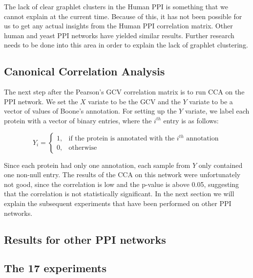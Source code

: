 The lack of clear graphlet clusters in the Human PPI is something that we cannot 
explain at the current time. Because of this, it has not been possible for us to get any actual insights from the Human PPI correlation matrix. Other human and yeast PPI networks have yielded similar results. Further research needs to be done into this area in order to explain the lack of graphlet clustering.

\subsection{Canonical Correlation Analysis}


The next step after the Pearson's GCV correlation matrix is to run CCA on the PPI network. We set the $X$ variate to be the GCV and the $Y$ variate to be a vector of values of Boone's annotation. For setting up the $Y$ variate, we label each protein with a vector of binary entries, where the $i^{th}$ entry is as follows:

$$ Y_i = \begin{cases} 1, & \mbox{if the protein is annotated with the } i^{th}\mbox{ annotation} \\ 0, & \mbox{otherwise} \end{cases}$$

Since each protein had only one annotation, each sample from $Y$ only contained one non-null entry. The results of the CCA on this network were unfortunately not good, since the correlation is low and the p-value is above 0.05, suggesting that the correlation is not statistically significant. In the next section we will explain the subsequent experiments that have been performed on other PPI networks.

\subsection{Results for other PPI networks}
\label{sec:cca_ppi_intro}

\subsection*{The 17 experiments}


